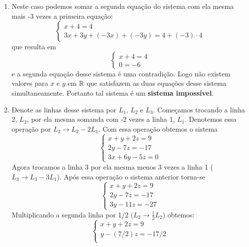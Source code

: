 \begin{exemplos}
	\begin{solucao}
		\begin{enumerate}[label={\arabic*})]
			\item Neste caso podemos somar a segunda equação do sistema com ela mesma mais -3 vezes a primeira equação:
				\[
					\begin{cases}
						x + 4 = 4\\
						3x + 3y + (-3x) + (-3y) = 4 + (-3)\cdot 4
					\end{cases}
				\]
			que resulta em
			\[
				\begin{cases}
					x + 4 = 4\\
					0 = -6
				\end{cases}
			\]
			e a segunda equação desse sistema é uma contradição. Logo não existem valores para $x$ e $y$ em $\mathbb{R}$ que satisfazem as duas equações desse sistema simultaneamente. Portanto tal sistema é um \textbf{sistema impossível}.
                    \item Denote as linhas desse sistema por $L_1$, $L_2$ e $L_3$. Começamos trocando a linha 2, $L_2$, por ela mesma somanda com -2 vezes a linha 1, $L_1$. Denotemos essa operação por $L_2 \to L_2 - 2L_1$. Com essa operação obtemos o sistema
                        \[
                            \begin{cases}
                                x + y + 2z = 9\\
                                2y - 7z = -17\\
                                3x + 6y - 5z = 0
                            \end{cases}
                        \]
                        Agora trocamos a linha 3 por ela mesma menos 3 vezes a linha 1 ($L_3 \to L_3 - 3L_1$). Após essa operação o sistema anterior torna-se
                        \[
                            \begin{cases}
                                x + y + 2z = 9\\
                                2y - 7z = -17\\
                                3y - 11z = -27
                            \end{cases}
                        \]
                        Multiplicando a segunda linha por 1/2 ($L_2 \to \frac{1}{2}L_2$) obtemos:
                        \[
                            \begin{cases}
                                x + y + 2z = 9\\
                                y - (7/2)z = -17/2\\

\end{cases}\]
\end{enumerate}
\end{solucao}
\end{exemplos}
